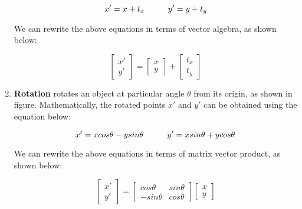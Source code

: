 \documentclass{book}
\begin{document}
\begin{enumerate}
                    \begin{equation} \label{eq_transNaive}
                        x' = x + t_{x} \hspace{10mm} y' = y + t_{y}
                    \end{equation}

                    We can rewrite the above equations in terms of vector algebra, as shown below: 

                    \begin{equation}
                        \begin{bmatrix}
                            x'\\ 
                            y'
                            \end{bmatrix} = 
                            \begin{bmatrix}
                            x\\ 
                            y
                            \end{bmatrix} + \begin{bmatrix}
                            t_{x}\\ 
                            t_{y}
                            \end{bmatrix}
                    \end{equation}
                    \item \textbf{Rotation} rotates an object at particular angle $\theta$ from its origin, as shown in figure. Mathematically, 
                    the rotated points $x'$ and $y'$ can be obtained using the equation below: 

                    \begin{equation}
                        x' = x cos\theta - ysin\theta \hspace{10mm} y' = xsin\theta + ycos\theta
                    \end{equation}

                    We can rewrite the above equations in terms of matrix vector product, as shown below: 

                    \begin{equation}
                        \begin{bmatrix}
                            x'\\ 
                            y'
                            \end{bmatrix} = \begin{bmatrix}
                            cos\theta & sin\theta\\ 
                            -sin\theta & cos\theta 
                            \end{bmatrix} 
                            \begin{bmatrix}
                            x\\ 
                            y
                            \end{bmatrix}
                    \end{equation}
                    
                \end{enumerate}
\end{document}

